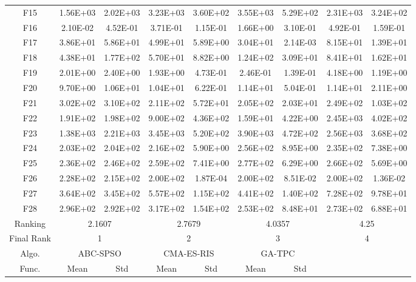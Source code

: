 \begin{table*}[htbp]
\begin{tabular}{|c|cc|cc|cc|cc|}
    F15   & 1.56E+03 & 2.02E+03 & 3.23E+03 & 3.60E+02 & 3.55E+03 & 5.29E+02 & 2.31E+03 & 3.24E+02 \\
    F16   & 2.10E-02 & 4.52E-01 & 3.71E-01 & 1.15E-01 & 1.66E+00 & 3.10E-01 & 4.92E-01 & 1.59E-01 \\
    F17   & 3.86E+01 & 5.86E+01 & 4.99E+01 & 5.89E+00 & 3.04E+01 & 2.14E-03 & 8.15E+01 & 1.39E+01 \\
    F18   & 4.38E+01 & 1.77E+02 & 5.70E+01 & 8.82E+00 & 1.24E+02 & 3.09E+01 & 8.41E+01 & 1.62E+01 \\
    F19   & 2.01E+00 & 2.40E+00 & 1.93E+00 & 4.73E-01 & 2.46E-01 & 1.39E-01 & 4.18E+00 & 1.19E+00 \\
    F20   & 9.70E+00 & 1.06E+01 & 1.04E+01 & 6.22E-01 & 1.14E+01 & 5.04E-01 & 1.14E+01 & 2.11E+00 \\
    \hline
    F21   & 3.02E+02 & 3.10E+02 & 2.11E+02 & 5.72E+01 & 2.05E+02 & 2.03E+01 & 2.49E+02 & 1.03E+02 \\
    F22   & 1.91E+02 & 1.98E+02 & 9.00E+02 & 4.36E+02 & 1.59E+01 & 4.22E+00 & 2.45E+03 & 4.02E+02 \\
    F23   & 1.38E+03 & 2.21E+03 & 3.45E+03 & 5.20E+02 & 3.90E+03 & 4.72E+02 & 2.56E+03 & 3.68E+02 \\
    F24   & 2.03E+02 & 2.04E+02 & 2.16E+02 & 5.90E+00 & 2.56E+02 & 8.95E+00 & 2.35E+02 & 7.38E+00 \\
    F25   & 2.36E+02 & 2.46E+02 & 2.59E+02 & 7.41E+00 & 2.77E+02 & 6.29E+00 & 2.66E+02 & 5.69E+00 \\
    F26   & 2.28E+02 & 2.15E+02 & 2.00E+02 & 1.87E-04 & 2.00E+02 & 8.51E-02 & 2.00E+02 & 1.36E-02 \\
    F27   & 3.64E+02 & 3.45E+02 & 5.57E+02 & 1.15E+02 & 4.41E+02 & 1.40E+02 & 7.28E+02 & 9.78E+01 \\
    F28   & 2.96E+02 & 2.92E+02 & 3.17E+02 & 1.54E+02 & 2.53E+02 & 8.48E+01 & 2.73E+02 & 6.88E+01 \\
    \hline
    Ranking & \multicolumn{2}{c|}{2.1607} & \multicolumn{2}{c|}{2.7679} & \multicolumn{2}{c|}{4.0357} & \multicolumn{2}{c|}{4.25} \\
    \hline
    Final Rank & \multicolumn{2}{c|}{1} & \multicolumn{2}{c|}{2} & \multicolumn{2}{c|}{3} & \multicolumn{2}{c|}{4} \\
    \hline
    \cline{1-7}
    Algo. & \multicolumn{2}{c|}{ABC-SPSO} & \multicolumn{2}{c|}{CMA-ES-RIS} & \multicolumn{2}{c|}{GA-TPC}   \\
    \cline{1-7}
    Func. & Mean  & Std   & Mean  & Std   & Mean  & Std   \\

\end{tabular}
\end{table*}
